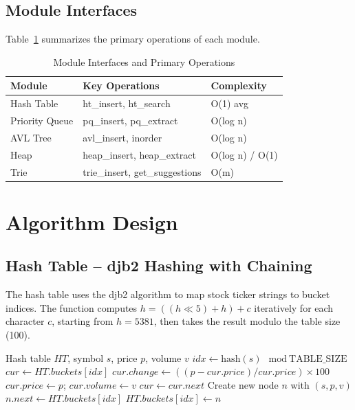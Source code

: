 \documentclass[conference]{IEEEtran}
\begin{document}
\subsection{Module Interfaces}

Table~\ref{tab:interfaces} summarizes the primary operations of each module.

\begin{table}[htbp]
\caption{Module Interfaces and Primary Operations}
\begin{center}
\begin{tabular}{|l|l|l|}
\hline
\textbf{Module} & \textbf{Key Operations} & \textbf{Complexity} \\
\hline
Hash Table & ht\_insert, ht\_search & O(1) avg \\
\hline
Priority Queue & pq\_insert, pq\_extract & O(log n) \\
\hline
AVL Tree & avl\_insert, inorder & O(log n) \\
\hline
Heap & heap\_insert, heap\_extract & O(log n) / O(1) \\
\hline
Trie & trie\_insert, get\_suggestions & O(m) \\
\hline
\end{tabular}
\label{tab:interfaces}
\end{center}
\end{table}

\section{Algorithm Design}

\subsection{Hash Table -- djb2 Hashing with Chaining}

The hash table uses the djb2 algorithm to map stock ticker strings to bucket indices. The function computes $h = ((h \ll 5) + h) + c$ iteratively for each character $c$, starting from $h = 5381$, then takes the result modulo the table size (100).

\begin{algorithm}
\caption{Hash Table Insert/Update (\texttt{ht\_insert})}
\begin{algorithmic}[1]
\REQUIRE Hash table $HT$, symbol $s$, price $p$, volume $v$
\STATE $idx \gets \text{hash}(s) \mod \text{TABLE\_SIZE}$
\STATE $cur \gets HT.buckets[idx]$
    \STATE $cur.change \gets ((p - cur.price)/cur.price) \times 100$
    \STATE $cur.price \gets p$; $cur.volume \gets v$
    \RETURN {}
  \ENDIF
  \STATE $cur \gets cur.next$
\ENDWHILE
\STATE Create new node $n$ with $(s, p, v)$
\STATE $n.next \gets HT.buckets[idx]$ 
\STATE $HT.buckets[idx] \gets n$
\end{algorithmic}
\end{algorithm}
\end{document}
